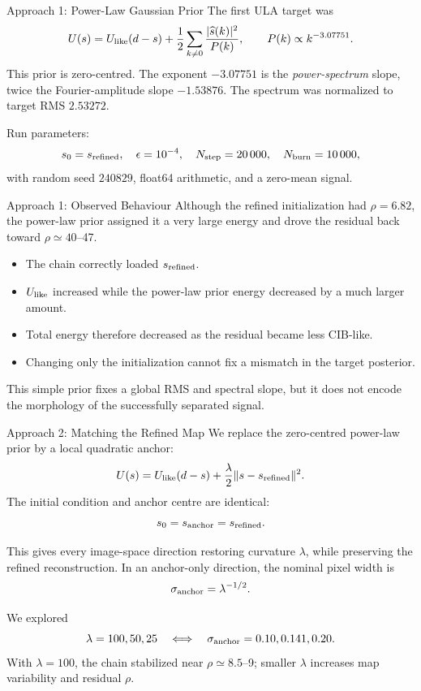 \documentclass[aspectratio=169]{beamer}
\newcommand{\Ulike}{U_{\rm like}}
\begin{document}
\begin{frame}{Approach 1: Power-Law Gaussian Prior}
  The first ULA target was
  \[
    U(s)=\Ulike(d-s)+\frac12
    \sum_{k\ne0}\frac{|\widehat{s}(k)|^2}{P(k)},
    \qquad
    P(k)\propto k^{-3.07751}.
  \]
  This prior is zero-centred. The exponent \(-3.07751\) is the
  \emph{power-spectrum} slope, twice the Fourier-amplitude slope
  \(-1.53876\). The spectrum was normalized to target RMS \(2.53272\).

  \vspace{0.2cm}
  Run parameters:
  \[
    s_0=s_{\rm refined},\quad
    \epsilon=10^{-4},\quad
    N_{\rm step}=20\,000,\quad
    N_{\rm burn}=10\,000,
  \]
  with random seed \(240829\), float64 arithmetic, and a zero-mean signal.
\end{frame}

\begin{frame}{Approach 1: Observed Behaviour}
  Although the refined initialization had \(\rho=6.82\), the power-law prior
  assigned it a very large energy and drove the residual back toward
  \(\rho\simeq40\)--47.

  \begin{itemize}
    \item The chain correctly loaded \(s_{\rm refined}\).
    \item \(\Ulike\) increased while the power-law prior energy decreased by a
      much larger amount.
    \item Total energy therefore decreased as the residual became less
      CIB-like.
    \item Changing only the initialization cannot fix a mismatch in the
      target posterior.
  \end{itemize}

  This simple prior fixes a global RMS and spectral slope, but it does not
  encode the morphology of the successfully separated signal.
\end{frame}

\begin{frame}{Approach 2: Matching the Refined Map}
  We replace the zero-centred power-law prior by a local quadratic anchor:
  \[
    U(s)=\Ulike(d-s)
    +\frac{\lambda}{2}\lVert s-s_{\rm refined}\rVert^2.
  \]
  The initial condition and anchor centre are identical:
  \[
    s_0=s_{\rm anchor}=s_{\rm refined}.
  \]

  This gives every image-space direction restoring curvature \(\lambda\),
  while preserving the refined reconstruction. In an anchor-only direction,
  the nominal pixel width is
  \[
    \sigma_{\rm anchor}=\lambda^{-1/2}.
  \]

  We explored
  \[
    \lambda=100,50,25
    \quad\Longleftrightarrow\quad
    \sigma_{\rm anchor}=0.10,0.141,0.20.
  \]
  With \(\lambda=100\), the chain stabilized near \(\rho\simeq8.5\)--9;
  smaller \(\lambda\) increases map variability and residual \(\rho\).
\end{frame}
\end{document}
